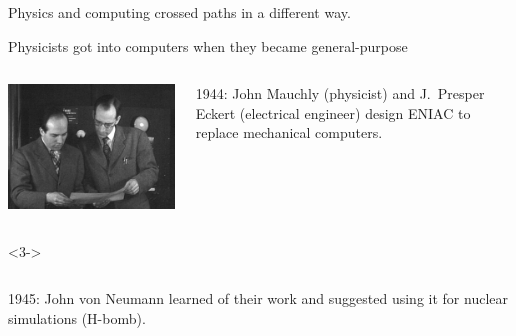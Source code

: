\documentclass[aspectratio=169]{beamer}
\begin{document}
\begin{frame}{}
\LARGE
\vspace{1.25 cm}
\begin{center}
Physics and computing crossed paths in a different way.
\end{center}
\end{frame}

\begin{frame}{Physicists got into computers when they became general-purpose}
\vspace{0.5 cm}

\begin{columns}
\includegraphics[width=\linewidth]{presper-and-mauchly.jpg}

1944: John Mauchly (physicist) and J.\ Presper Eckert (electrical engineer) design ENIAC to replace mechanical computers.

\vspace{0.25 cm}
\end{columns}

\vspace{0.25 cm}
\begin{uncoverenv}<3->
\begin{columns}
1945: John von Neumann learned of their work and suggested using it for nuclear simulations (H-bomb).

\vspace{0.25 cm}


\end{columns}
\end{uncoverenv}
\end{frame}
\end{document}
